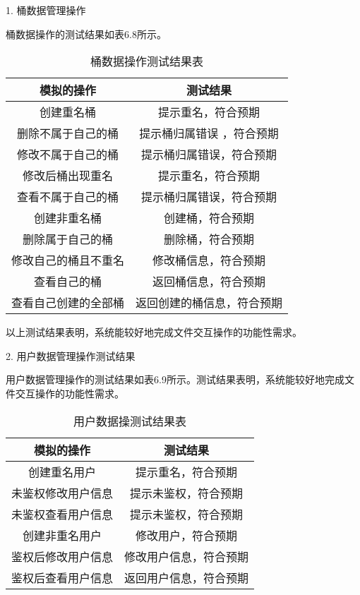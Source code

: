 1. 桶数据管理操作

桶数据操作的测试结果如表6.8所示。

\begin{table}[h]
  \centering
  \caption{桶数据操作测试结果表}
  \begin{tabular}{cc}
    \toprule
    模拟的操作   & 测试结果   \\
    \midrule
    创建重名桶           & 提示重名，符合预期  \\
    删除不属于自己的桶    & 提示桶归属错误 ，符合预期    \\
    修改不属于自己的桶    & 提示桶归属错误，符合预期  \\
    修改后桶出现重名      & 提示重名，符合预期  \\
    查看不属于自己的桶    & 提示桶归属错误，符合预期     \\
    创建非重名桶          & 创建桶，符合预期  \\
    删除属于自己的桶      & 删除桶，符合预期     \\
    修改自己的桶且不重名   & 修改桶信息，符合预期  \\
    查看自己的桶          & 返回桶信息，符合预期     \\
    查看自己创建的全部桶   & 返回创建的桶信息，符合预期     \\
    \bottomrule
  \end{tabular}
\end{table}

以上测试结果表明，系统能较好地完成文件交互操作的功能性需求。

2. 用户数据管理操作测试结果

用户数据管理操作的测试结果如表6.9所示。测试结果表明，系统能较好地完成文件交互操作的功能性需求。
\newline

\begin{table}[h]
  \centering
  \caption{用户数据操测试结果表}
  \begin{tabular}{cc}
    \toprule
    模拟的操作   & 测试结果   \\
    \midrule
    创建重名用户           & 提示重名，符合预期  \\
    未鉴权修改用户信息     & 提示未鉴权，符合预期     \\
    未鉴权查看用户信息     & 提示未鉴权，符合预期 \\
    创建非重名用户         & 修改用户，符合预期    \\
    鉴权后修改用户信息     & 修改用户信息，符合预期    \\
    鉴权后查看用户信息      & 返回用户信息，符合预期   \\
    \bottomrule
  \end{tabular}
\end{table}

